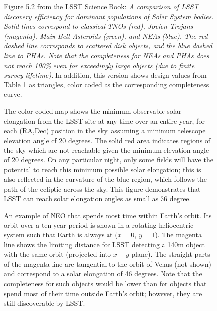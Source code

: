 \documentclass[manuscript]{aastex}
\begin{document}
\begin{figure}[h!]
\vskip -1.3in
\caption{Figure 5.2 from the LSST Science Book: {\it A comparison of LSST discovery efficiency for dominant 
populations of Solar System bodies. Solid lines correspond to 
classical TNOs (red), Jovian Trojans (magenta), Main Belt Asteroids
(green), and NEAs (blue). The red dashed line corresponds to 
scattered disk objects, and the blue dashed line to PHAs. Note that
the completeness for NEAs and PHAs does not reach 100\% even for
exceedingly large objects (due to finite survey lifetime).}
In addition, this version shows design values from Table 1 as triangles,
color coded as the corresponding completeness curve. 
\label{fig:C}
}
\end{figure}



\begin{figure}[t!]
\vskip -2.3in
\vskip -1.6in
\caption{
The color-coded map shows the minimum observable solar elongation from the LSST site at any time over 
an entire year, for each (RA,Dec) position in the sky, assuming a minimum telescope elevation angle of 20 degrees.
The solid red area indicates regions of the sky which are not reachable given the minimum elevation angle of 
20 degrees. On any particular night, only some fields will have the potential to reach this minimum possible 
solar elongation; this is also reflected in the curvature of the blue region, which follows the path of the ecliptic 
across the sky. This figure demonstrates that LSST can reach solar elongation angles
as small as 36 degree.
\label{fig:minang}
}
\end{figure}


\begin{figure}[b!]
\vskip -1.3in
\vskip -1.0in
\caption{An example of NEO that spends most time within Earth's orbit. Its orbit over a ten year period is
shown in a rotating heliocentric system such that Earth is always at ($x=0$, $y=1$). The magenta line shows the limiting 
distance for LSST detecting a 140m object with the same orbit (projected into $x-y$ plane). The straight 
parts of the magenta line are tangential to the orbit of Venus (not shown) and correspond to a solar elongation
of 46 degrees. Note that the completeness for such objects would be lower than for objects that spend most of their
time outside Earth's orbit; however, they are still discoverable by LSST. 
\label{fig:volume}
}
\end{figure}
\end{document}
